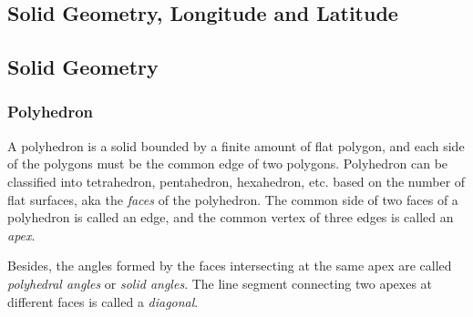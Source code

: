\documentclass{report}
\begin{document}
\begin{multicols}{2}

    \chapter{Solid Geometry, Longitude and Latitude}

    \section{Solid Geometry}

    \subsection*{Polyhedron}

    A polyhedron is a solid bounded by a finite amount of flat polygon, and each
    side of the polygons must be the common edge of two polygons. Polyhedron can be
    classified into tetrahedron, pentahedron, hexahedron, etc. based on the number
    of flat surfaces, aka the \emph{faces} of the polyhedron. The common side of
    two faces of a polyhedron is called an edge, and the common vertex of three
    edges is called an \emph{apex}.

    Besides, the angles formed by the faces intersecting at the same apex are
    called \emph{polyhedral angles} or \emph{solid angles}. The line segment
    connecting two apexes at different faces is called a \emph{diagonal}.


\end{multicols}
\end{document}
